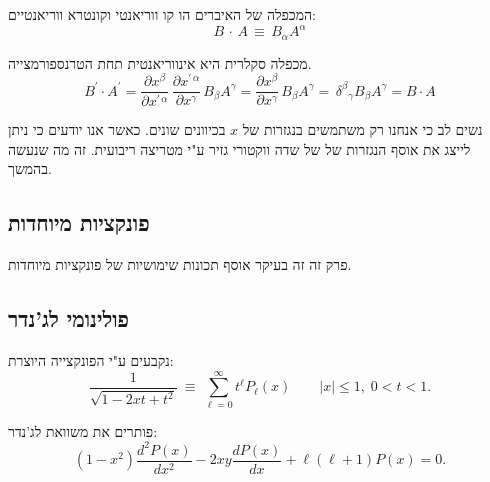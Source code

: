 \documentclass{tstextbook}
\begin{document}
\begin{definition}
המכפלה של האיברים הו קו ווריאנטי וקונטרא ווריאנטיים:
$$B\,\cdot\,A\,\equiv\,B_{\alpha}A^{\alpha}$$

\end{definition}
\begin{proposition}
מכפלה סקלרית היא אינווריאנטית תחת הטרנספורמצייה.
$$B^{\prime}\cdot A^{\prime}=\frac{\partial x^{\beta}}{\partial x^{\prime\,\alpha}}\,\frac{\partial x^{\prime\,\alpha}}{\partial x^{\gamma}}\,B_{\beta}A^{\gamma}=\frac{\partial x^{\beta}}{\partial x^{\gamma}}\,B_{\beta}A^{\gamma}=\,\delta^{\beta}{}_{\gamma}B_{\beta}A^{\gamma}=B\cdot A$$

\end{proposition}
\begin{remark}
נשים לב כי אנחנו רק משתמשים בנגזרות של \(x\) בכיוונים שונים. כאשר אנו יודעים כי ניתן לייצג את אוסף הנגזרות של של שדה ווקטורי גזיר ע"י מטריצה ריבועית. זה מה שנעשה בהמשך.

\end{remark}
\subsection{פונקציות מיוחדות}

פרק זה זה בעיקר אוסף תכונות שימושיות של פונקציות מיוחדות.

\subsection{פולינומי לג'נדר}

נקבעים ע"י הפונקצייה היוצרת:
$$\frac{1}{\sqrt{1-2x t+t^{2}}}\ \equiv\ \sum_{\ell=0}^{\infty}t^{\ell}P_{\ell}(x)\qquad|x|\leq1,\;0<t<1.$$

פותרים את משוואת לג'נדר:
$$(1-x^{2})\frac{d^{2}P(x)}{d x^{2}}-2x y\frac{d P(x)}{d x}+\ell(\ell+1)P(x)=0.$$
\end{document}
